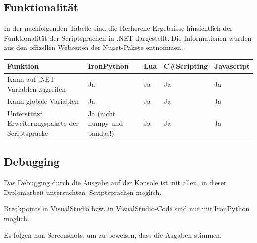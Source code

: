 \newpage
\subsection{Funktionalität}
In der nachfolgenden Tabelle sind die Recherche-Ergebnisse hinsichtlich der Funktionalität der Scriptsprachen in .NET dargestellt.
Die Informationen wurden aus den offizellen Webseiten der Nuget-Pakete entnommen.

\begin{table}[H]
    \begin{tabular}{|p{3cm}|p{3cm}|p{3cm}|p{3cm}|p{3cm}|}
        \hline
        Funktion & IronPython & Lua & C\#Scripting & Javascript\\ \hline
        Kann auf .NET Variablen zugreifen & Ja & Ja & Ja & Ja \\ \hline
        Kann globale Variablen & Ja & Ja & Ja & Ja \\ \hline
        Unterstützt Erweiterungspakete der Scriptsprache & Ja (nicht numpy und pandas!) & Ja & Ja & Ja \\ \hline 
    \end{tabular} 
\end{table}
\newpage
\subsection{Debugging}
Das Debugging durch die Ausgabe auf der Konsole ist mit allen, in dieser Diplomarbeit untersuchten, Scriptsprachen möglich.

Breakpoints in VisualStudio bzw. in VisualStudio-Code sind nur mit IronPython möglich.


Es folgen nun Screenshots, um zu beweisen, dass die Angaben stimmen.

